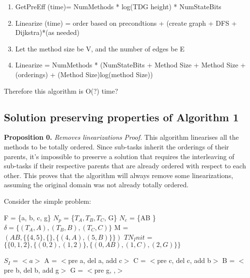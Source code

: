  
\begin{enumerate}
	\item GetPreEff (time)= NumMethods * log(TDG height) * NumStateBits
	\item Linearize (time) =  order based on precondtions + (create graph + DFS + Dijkstra)*(as needed)
	\item Let the method size be V, and the number of edges be E
	\item Linearize = NumMethods * (NumStateBits + Method Size + Method Size + (orderings) + (Method Size)log(method Size))
\end{enumerate}
Therefore this algorithm is O(?) time?

 

\subsection{Solution preserving properties of Algorithm 1}
\textbf{Proposition 0.} \textit{Removes linearizations} \newline
\textit{Proof.}
This algorithm linearises all the methods to be totally ordered. Since sub-tasks inherit the orderings of their parents, it's impossible to preserve a solution that requires the interleaving of sub-tasks if their respective parents that are already ordered with respect to each other. This proves that the algorithm will always remove some linearizations, assuming the original domain was not already totally ordered.

Consider the simple problem:

F = \{a, b, c, g\}                                                           \newline
$N_p$ = \{$T_A, T_B, T_C$, G\}                                               \newline
$N_c$ = \{AB \}                                                               \newline
$\delta = \{ (T_A, A), (T_B, B), (T_C, C) \}$                                 \newline
M = $(AB,  \{ \{4,5\}, \{\}, \{(4,A), (5,B)\} \} )$                            \newline
$TN_Init$ = $\{ \{0,1,2\},  \{(0,2), (1,2)\}, \{(0,AB), (1,C), (2,G)\} \}$     \newline
	
	
$S_I$ = $<a>$	
	A = $<$pre a, del a, add c$>$          \newline
	C = $<$pre c, del c, add b$>$          \newline
	B = $<$pre b, del b, add g$>$          \newline
	G = $<$pre g, ,$>$                    \newline
	
